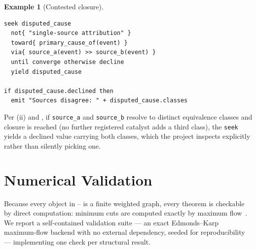 \documentclass[11pt,twocolumn,a4paper]{article}
\theoremstyle{thmstyle}
\theoremstyle{definition}
\newtheorem{example}[theorem]{Example}
\theoremstyle{remark}
\begin{document}
\begin{example}[Contested closure]
\label{ex:decline}
\begin{lstlisting}[caption={A seek that honestly declines.}]
seek disputed_cause
  not{ "single-source attribution" }
  toward{ primary_cause_of(event) }
  via{ source_a(event) >> source_b(event) }
  until converge otherwise decline
  yield disputed_cause

if disputed_cause.declined then
  emit "Sources disagree: " + disputed_cause.classes
\end{lstlisting}
Per (ii) and , if
\texttt{source\_a} and \texttt{source\_b} resolve to distinct equivalence
classes and closure is reached (no further registered catalyst adds a
third class), the \texttt{seek} yields a declined value carrying both
classes, which the project inspects explicitly rather than silently
picking one.
\end{example}

\section{Numerical Validation}
\label{sec:validation}

Because every object in -- is a finite
weighted graph, every theorem is checkable by direct computation: minimum
cuts are computed exactly by maximum flow~\citep{fordfulkerson1956,%
goldberg1988new}. We report a self-contained validation suite --- an exact
Edmonds--Karp~\citep{edmondskarp1972} maximum-flow backend with no
external dependency, seeded for reproducibility --- implementing one check
per structural result.
\end{document}
